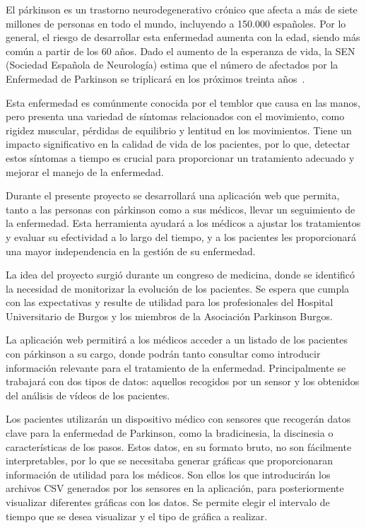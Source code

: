 
El párkinson es un trastorno neurodegenerativo crónico que afecta a más de siete millones de personas en todo el mundo, incluyendo a 150.000 españoles. Por lo general, el riesgo de desarrollar esta enfermedad aumenta con la edad, siendo más común a partir de los 60 años. Dado el aumento de la esperanza de vida, la SEN (Sociedad Española de Neurología) estima que el número de afectados por la Enfermedad de Parkinson se triplicará en los próximos treinta años~\cite{afectadosParkinson}.

Esta enfermedad es comúnmente conocida por el temblor que causa en las manos, pero presenta una variedad de síntomas relacionados con el movimiento, como rigidez muscular, pérdidas de equilibrio y lentitud en los movimientos. Tiene un impacto significativo en la calidad de vida de los pacientes, por lo que, detectar estos síntomas a tiempo es crucial para proporcionar un tratamiento adecuado y mejorar el manejo de la enfermedad.

Durante el presente proyecto se desarrollará una aplicación web que permita, tanto a las personas con párkinson como a sus médicos, llevar un seguimiento de la enfermedad. Esta herramienta ayudará a los médicos a ajustar los tratamientos y evaluar su efectividad a lo largo del tiempo, y a los pacientes les proporcionará una mayor independencia en la gestión de su enfermedad.

La idea del proyecto surgió durante un congreso de medicina, donde se identificó la necesidad de monitorizar la evolución de los pacientes. Se espera que cumpla con las expectativas y resulte de utilidad para los profesionales del Hospital Universitario de Burgos y los miembros de la Asociación Parkinson Burgos. 

La aplicación web permitirá a los médicos acceder a un listado de los pacientes con párkinson a su cargo, donde podrán tanto consultar como introducir información relevante para el tratamiento de la enfermedad. Principalmente se trabajará con dos tipos de datos: aquellos recogidos por un sensor y los obtenidos del análisis de vídeos de los pacientes.

Los pacientes utilizarán un dispositivo médico con sensores que recogerán datos clave para la enfermedad de Parkinson, como la bradicinesia, la discinesia o características de los pasos. Estos datos, en su formato bruto, no son fácilmente interpretables, por lo que se necesitaba generar gráficas que proporcionaran información de utilidad para los médicos. 
Son ellos los que introducirán los archivos CSV generados por los sensores en la aplicación, para posteriormente visualizar diferentes gráficas con los datos. Se permite elegir el intervalo de tiempo que se desea visualizar y el tipo de gráfica a realizar.

